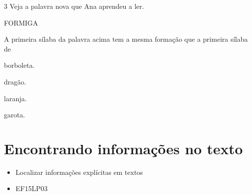 \num{3} Veja a palavra nova que Ana aprendeu a ler.

\begin{myquote}
FORMIGA
\end{myquote}

A primeira sílaba da palavra acima tem a mesma formação que a 
primeira sílaba de

\begin{escolha}
\item borboleta.

\item dragão.

\item laranja.

\item garota.
\end{escolha}


\chapter[Encontrando informações no texto]{\Large Encontrando informações no texto}



\begin{itemize}
	\item Localizar informações explícitas em textos
\end{itemize}


\begin{itemize}
\item EF15LP03
\end{itemize}

